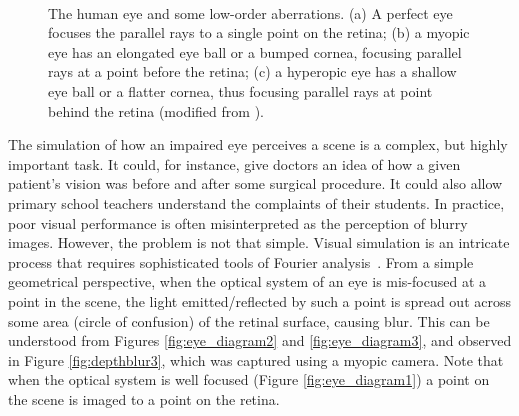 \begin{figure}[h]

	\centering

	~
	~

	\caption[The human eye and some low-order aberrations]{The human eye and some low-order aberrations. (a) A perfect eye focuses the parallel rays to a single point on the retina; (b) a myopic eye has an elongated eye ball or a bumped cornea, focusing parallel rays at a point before the retina; (c) a hyperopic eye has a shallow eye ball or a flatter cornea, thus focusing parallel rays at point behind the retina (modified from \cite{Pamplona2010}).}
	\label{fig:eye_diagram}
\end{figure}

The simulation of how an impaired eye perceives a scene is a complex, but highly important task. It could, for instance, give doctors an idea of how a given patient's vision was before and after some surgical procedure. It could also allow primary school teachers understand the complaints of their students. In practice, poor visual performance is often misinterpreted as the perception of blurry images. However, the problem is not that simple. Visual simulation is an intricate process that requires sophisticated tools of Fourier analysis~\cite{Thibos2011}. From a simple geometrical perspective, when the optical system of an eye is mis-focused at a point in the scene, the light emitted/reflected by such a point is spread out across some area (circle of confusion) of the retinal surface, causing blur. This can be understood from Figures \ref{fig:eye_diagram2} and \ref{fig:eye_diagram3}, and observed in Figure
\ref{fig:depthblur3}, which was captured using a myopic camera. Note that when the optical system is well focused (Figure \ref{fig:eye_diagram1}) a point on the scene is imaged to a point on the retina. 


